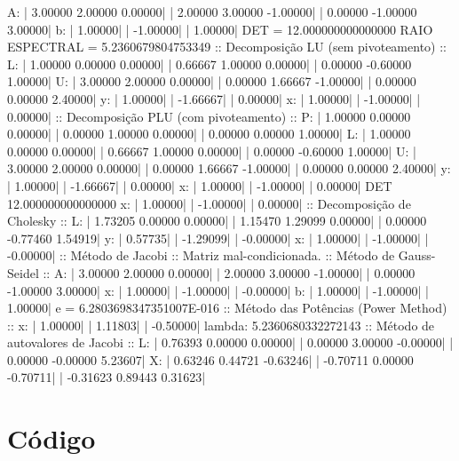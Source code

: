\documentclass{homework}
\begin{document}
	\begin{fortran}
	 A:
	|   3.00000    2.00000    0.00000|
	|   2.00000    3.00000   -1.00000|
	|   0.00000   -1.00000    3.00000|
	b:
	|   1.00000|
	|  -1.00000|
	|   1.00000|
	DET =   12.000000000000000     
	RAIO ESPECTRAL =   5.2360679804753349     
	:: Decomposição LU (sem pivoteamento) ::
	L:
	|   1.00000    0.00000    0.00000|
	|   0.66667    1.00000    0.00000|
	|   0.00000   -0.60000    1.00000|
	U:
	|   3.00000    2.00000    0.00000|
	|   0.00000    1.66667   -1.00000|
	|   0.00000    0.00000    2.40000|
	y:
	|   1.00000|
	|  -1.66667|
	|   0.00000|
	x:
	|   1.00000|
	|  -1.00000|
	|   0.00000|
	:: Decomposição PLU (com pivoteamento) ::
	P:
	|   1.00000    0.00000    0.00000|
	|   0.00000    1.00000    0.00000|
	|   0.00000    0.00000    1.00000|
	L:
	|   1.00000    0.00000    0.00000|
	|   0.66667    1.00000    0.00000|
	|   0.00000   -0.60000    1.00000|
	U:
	|   3.00000    2.00000    0.00000|
	|   0.00000    1.66667   -1.00000|
	|   0.00000    0.00000    2.40000|
	y:
	|   1.00000|
	|  -1.66667|
	|   0.00000|
	x:
	|   1.00000|
	|  -1.00000|
	|   0.00000|
	DET
	12.000000000000000     
	x:
	|   1.00000|
	|  -1.00000|
	|   0.00000|
	:: Decomposição de Cholesky ::
	L:
	|   1.73205    0.00000    0.00000|
	|   1.15470    1.29099    0.00000|
	|   0.00000   -0.77460    1.54919|
	y:
	|   0.57735|
	|  -1.29099|
	|  -0.00000|
	x:
	|   1.00000|
	|  -1.00000|
	|  -0.00000|
	:: Método de Jacobi ::
	Matriz mal-condicionada.
	:: Método de Gauss-Seidel ::
	A:
	|   3.00000    2.00000    0.00000|
	|   2.00000    3.00000   -1.00000|
	|   0.00000   -1.00000    3.00000|
	x:
	|   1.00000|
	|  -1.00000|
	|  -0.00000|
	b:
	|   1.00000|
	|  -1.00000|
	|   1.00000|
	e =    6.2803698347351007E-016
	:: Método das Potências (Power Method) ::
	x:
	|   1.00000|
	|   1.11803|
	|  -0.50000|
	lambda:
	5.2360680332272143     
	:: Método de autovalores de Jacobi ::
	L:
	|   0.76393    0.00000    0.00000|
	|   0.00000    3.00000   -0.00000|
	|   0.00000   -0.00000    5.23607|
	X:
	|   0.63246    0.44721   -0.63246|
	|  -0.70711    0.00000   -0.70711|
	|  -0.31623    0.89443    0.31623|
	\end{fortran}

	\pagebreak
	\appendixpage
	\appendix \section*{Código}
	
	
%		
\end{document}
